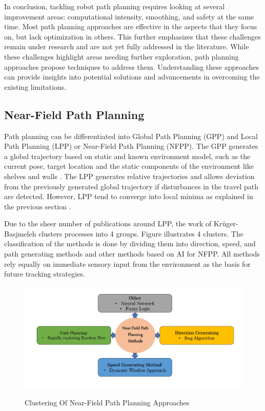 In conclusion, tackling robot path planning requires looking at several improvement
areas: computational intensity, smoothing, and safety at the same time. Most path planning approaches 
are effective in the aspects that they focus on, but lack optimization in others. This further emphasizes that these 
challenges remain under research and are not yet fully addressed in the literature. While these challenges 
highlight areas needing further exploration, path planning approaches propose techniques 
to address them. Understanding these approaches can provide insights into potential solutions and 
advancements in overcoming the existing limitations.


\subsection{Near-Field Path Planning}
Path planning can be differentiated into Global Path Planning (GPP) and Local
Path Planning (LPP) or Near-Field Path Planning (NFPP). The GPP generates a global trajectory based on static and 
known environment model, such as the current pose, target location and the static components 
of the environment like shelves and walls \cite{R28}. 
The LPP generates relative trajectories and allows deviation from the previously generated global 
trajectory if disturbances in the travel path are detected. However, LPP tend to converge into local 
minima as explained in the previous section .

Due to the sheer number of publications around LPP, the work of  Kr\"uger-Basjmeleh \cite{R28} clusters 
processes into 4 groups. Figure  illustrates 4 clusters. 
The classification of the methods is done by dividing them into direction, speed, and path generating methods and 
other methods based on AI for NFPP. All methods rely equally on immediate sensory input from the 
environment as the basis for future tracking strategies.

\begin{figure}[H]
    \begin{center}
        \includegraphics[width=6in]{images/Chap1/PP_Approaches.jpg}\\
        \caption{Clustering Of Near-Field Path Planning Approaches \cite{R28}}
        \label{cluster}
        \end{center}
\end{figure}

